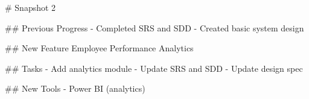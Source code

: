 
# Snapshot 2

## Previous Progress
- Completed SRS and SDD
- Created basic system design

## New Feature
Employee Performance Analytics

## Tasks
- Add analytics module
- Update SRS and SDD
- Update design spec

## New Tools
- Power BI (analytics)
